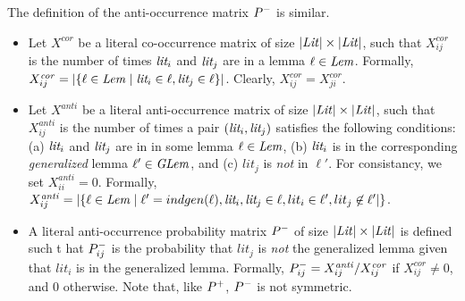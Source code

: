 The definition of the anti-occurrence matrix $P^-$ is similar. \newcommand{\xcor}{X^\mathit{cor}}
\newcommand{\xanti}{X^{\mathit{anti}}}
\begin{itemize}
    \item Let $\xcor$ be a literal co-occurrence matrix of size $|\mathit{Lit}| \times |\mathit{Lit}|$, such that $\xcor_{ij}$ is the number of times $\textit{lit}_i$ and $\textit{lit}_j$ are in a lemma $\ell \in \mathit{Lem}$. Formally, $\xcor_{ij} = |\{ \ell \in \Lem \mid \lit_i \in \ell, \lit_j \in \ell\}|$. Clearly, $\xcor_{ij} = \xcor_{ji}$.
    \item  Let $\xanti$ be a literal anti-occurrence matrix of size $|\mathit{Lit}| \times |\mathit{Lit}|$, such that $\xanti_{ij}$ is the number of times a pair $(\textit{lit}_i, \textit{lit}_j)$ satisfies the following conditions: (a) $\textit{lit}_i$ and $\textit{lit}_j$ are in in some lemma $\ell \in \mathit{Lem}$, (b) $\textit{lit}_i$ is in the corresponding \emph{generalized} lemma $\ell' \in \mathit{GLem}$, and (c) $lit_j$ is \emph{not} in $\ell'$. For consistancy, we set $\xanti_{ii} = 0$. Formally, $\xanti_{ij} = |\{ \ell \in \Lem 
    \mid 
    \ell' = indgen(\ell), 
    \lit_i,\lit_j \in \ell,  
    lit_i \in \ell', lit_j \not\in \ell'|\}$.
    \item     A literal anti-occurrence probability matrix $P^-$ of size $|\mathit{Lit}| \times |\mathit{Lit}|$ is defined such t hat $P^-_{ij}$ is the probability that $lit_j$ is \emph{not} the generalized lemma given that $lit_i$ is in the generalized lemma. Formally, $\Pneg_{ij} = \xanti_{ij}/\xcor_{ij}$ if $\xcor_{ij} \neq 0$, and $0$ otherwise. Note that, like $P^+$, $P^-$ is not symmetric.
\end{itemize}



     
    

